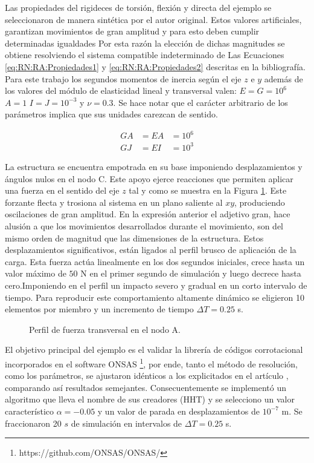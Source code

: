 Las propiedades del rigideces de torsión, flexión y directa del ejemplo se seleccionaron de manera sintética por el autor original. Estos valores artificiales, garantizan movimientos de gran amplitud y para esto deben cumplir determinadas igualdades Por esta razón la elección de dichas magnitudes se obtiene resolviendo el sistema compatible indeterminado de Las Ecuaciones \eqref{eq:RN:RA:Propiedades1} y \eqref{eq:RN:RA:Propiedades2} descritas en la bibliografía. Para este trabajo los segundos momentos de inercia según el eje $z$ e $y$ además de los valores del módulo de elasticidad lineal y transversal valen: $ E=G=10^6$ $A=1 $  $I=J=10^{-3}$ y $\nu=0.3$. Se hace notar que el carácter arbitrario de los parámetros implica que sus unidades carezcan de sentido. 

\begin{eqnarray}\label{eq:RN:RA:Propiedades1}
	GA &= EA& =10^6\\\label{eq:RN:RA:Propiedades2}
	GJ &= EI& =10^3
\end{eqnarray}

La estructura se encuentra empotrada en su base imponiendo desplazamientos y ángulos nulos en el nodo C. Este apoyo ejerce reacciones que permiten aplicar una fuerza en el sentido del eje $z$ tal y como se muestra en la Figura \ref{fig:RN:RA:Force}. Este forzante flecta y trosiona al sistema en un plano saliente al $xy$, produciendo oscilaciones de gran amplitud. En la expresión anterior el adjetivo gran, hace alusión a que los movimientos desarrollados durante el movimiento, son del mismo orden de magnitud que las dimensiones de la estructura. Estos desplazamientos significativos, están ligados al perfil brusco de aplicación de la carga. Esta fuerza actúa linealmente en los dos segundos iniciales, crece hasta un valor máximo de $50$ N en el primer segundo de simulación y luego decrece hasta cero.Imponiendo en el perfil un impacto severo y gradual en un corto intervalo de tiempo. Para reproducir este comportamiento altamente dinámico se eligieron 10 elementos por miembro y un incremento de tiempo $\Delta T = 0.25$ s. 


\begin{figure}[htbp]
	\centering
	\def\svgwidth{80mm}
	
	\caption{Perfil de fuerza transversal en el nodo A.}
	\label{fig:RN:RA:Force}
\end{figure}

El objetivo principal del ejemplo es el validar la librería de códigos corrotacional incorporados en el software ONSAS \footnote{https://github.com/ONSAS/ONSAS/}, por ende, tanto el método de resolución, como los parámetros, se ajustaron idénticos a los explicitados en el artículo \cite{Le2014}, comparando así resultados semejantes. Consecuentemente se implementó un algoritmo que lleva el nombre de sus creadores (HHT) y se selecciono un valor característico $\alpha=-0.05$ y un valor de parada en desplazamientos de $10^{-7}$ m. Se fraccionaron 20 $s$ de simulación en intervalos de $\Delta T=0.25$ s.

